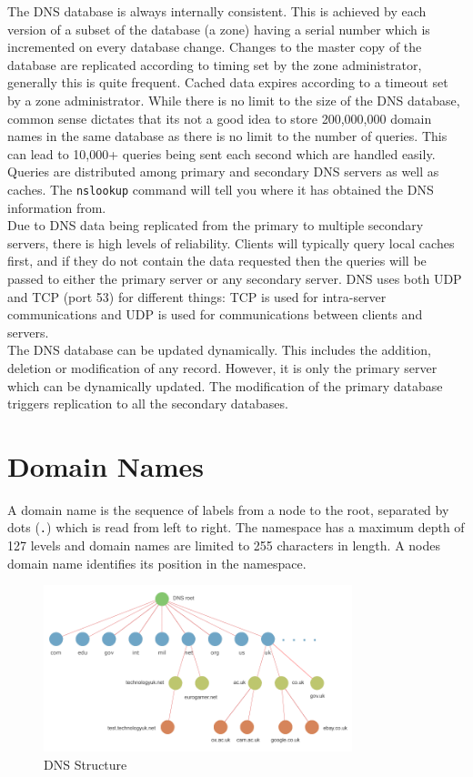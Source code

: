 The DNS database is always internally consistent. This is achieved by each version of a subset of the database (a zone) having a serial number which is incremented on every database change. Changes to the master copy of the database are replicated according to timing set by the zone administrator, generally this is quite frequent. Cached data expires according to a timeout set by a zone administrator. While there is no limit to the size of the DNS database, common sense dictates that its not a  good idea to store 200,000,000 domain names in the same database as there is no limit to the number of queries. This can lead to 10,000+ queries being sent each second which are handled easily. Queries are distributed among primary and secondary DNS servers as well as caches. The \verb|nslookup| command will tell you where it has obtained the DNS information from.\\

Due to DNS data being replicated from the primary to multiple secondary servers, there is high levels of reliability. Clients will typically query local caches first, and if they do not contain the data requested then the queries will be passed to either the primary server or any secondary server. DNS uses both UDP and TCP (port 53) for different things: TCP is used for intra-server communications and UDP is used for communications between clients and servers.\\

The DNS database can be updated dynamically. This includes the addition, deletion or modification of any record. However, it is only the primary server which can be dynamically updated. The modification of the primary database triggers replication to all the secondary databases.

\section{Domain Names}
A domain name is the sequence of labels from a node to the root, separated by dots (\verb|.|) which is read from left to right. The namespace has a maximum depth of 127 levels and domain names are limited to 255 characters in length. A nodes domain name identifies its position in the namespace.

\begin{figure}[H]
    \centering
    \includegraphics[width=0.8\textwidth]{assets/dns-structure.png}    
    \caption{DNS Structure}
\end{figure}

